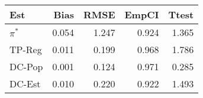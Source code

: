 
\begin{tabular}{lrrrr}
\toprule
Est & Bias & RMSE & EmpCI & Ttest\\
\midrule
$\pi^*$ & 0.054 & 1.247 & 0.924 & 1.365\\
TP-Reg & 0.011 & 0.199 & 0.968 & 1.786\\
DC-Pop & 0.001 & 0.124 & 0.971 & 0.285\\
DC-Est & 0.010 & 0.220 & 0.922 & 1.493\\
\bottomrule
\end{tabular}